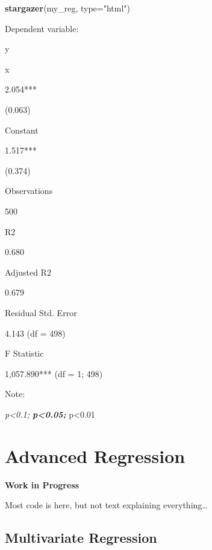 \documentclass[]{book}
\newenvironment{Shaded}{\begin{snugshade}}{\end{snugshade}}
\newcommand{\KeywordTok}[1]{\textcolor[rgb]{0.13,0.29,0.53}{\textbf{#1}}}
\newcommand{\DataTypeTok}[1]{\textcolor[rgb]{0.13,0.29,0.53}{#1}}
\newcommand{\StringTok}[1]{\textcolor[rgb]{0.31,0.60,0.02}{#1}}
\newcommand{\NormalTok}[1]{#1}
\theoremstyle{definition}
\theoremstyle{definition}
\theoremstyle{definition}
\theoremstyle{remark}
\begin{document}
\begin{Shaded}
\begin{Highlighting}[]
\KeywordTok{stargazer}\NormalTok{(my_reg, }\DataTypeTok{type=}\StringTok{"html"}\NormalTok{) }
\end{Highlighting}
\end{Shaded}

Dependent variable:

y

x

2.054***

(0.063)

Constant

1.517***

(0.374)

Observations

500

R2

0.680

Adjusted R2

0.679

Residual Std. Error

4.143 (df = 498)

F Statistic

1,057.890*** (df = 1; 498)

Note:

\emph{p\textless{}0.1; \textbf{p\textless{}0.05; }}p\textless{}0.01

\chapter{Advanced Regression}\label{advanced-regression}

\textbf{Work in Progress}

Most code is here, but not text explaining everything\ldots{}

\section{Multivariate Regression}\label{multivariate-regression}
\end{document}
